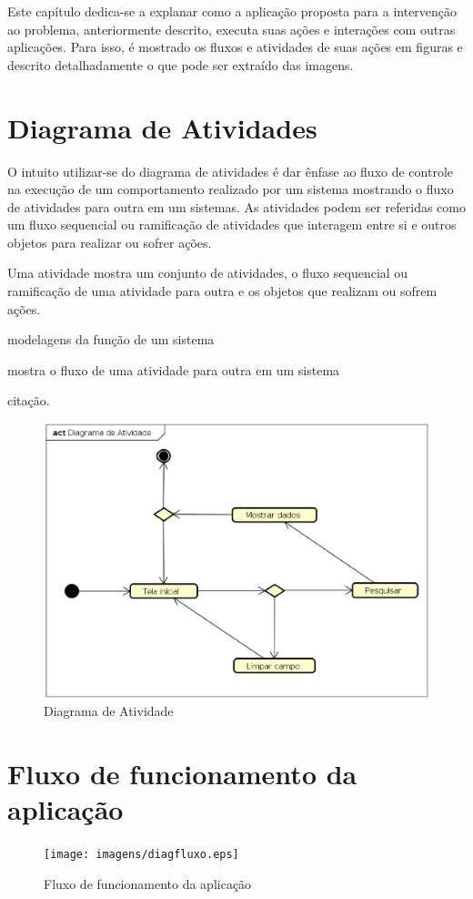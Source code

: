 Este capítulo dedica-se a explanar como a aplicação proposta para a intervenção ao problema, anteriormente descrito, executa suas ações e interações com outras aplicações. Para isso, é mostrado os fluxos e atividades de suas ações em figuras e descrito detalhadamente o que pode ser extraído das imagens.

\section{Diagrama de Atividades}
O intuito utilizar-se do diagrama de atividades é dar ênfase ao fluxo de controle na execução de um comportamento realizado por um sistema mostrando o fluxo de atividades para outra em um sistemas. As atividades podem ser referidas como um fluxo sequencial ou ramificação de atividades que interagem entre si e outros objetos para realizar ou sofrer ações.

Uma atividade mostra um conjunto de atividades, o fluxo sequencial ou ramificação de uma atividade para outra e os objetos que realizam ou sofrem ações.

modelagens da função de um sistema

mostra o fluxo de uma atividade para outra em um sistema

citação\cite{Booch:2012}.

\begin{figure}[!htb]
        \caption{\label{diagrama1}Diagrama de Atividade}
        \begin{center}
                \includegraphics[width=\textwidth]{imagens/diagact.eps}
        \end{center}
\end{figure}

\section{Fluxo de funcionamento da aplicação}

\begin{figure}[!htb]
        \caption{\label{diagrama1}Fluxo de funcionamento da aplicação}
        \begin{center}
                \texttt{[image: imagens/diagfluxo.eps]}
        \end{center}
\end{figure}
